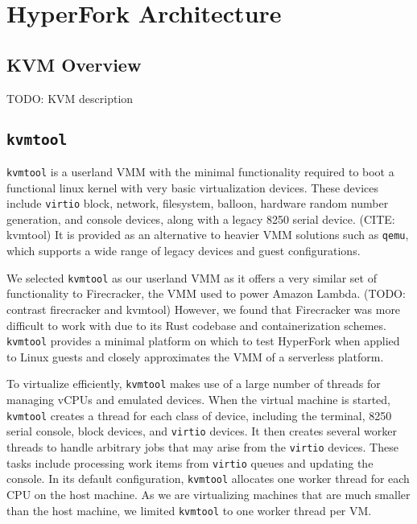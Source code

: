 
\newcommand{\kvmtool}[0]{\texttt{kvmtool}}
\newcommand{\virtio}[0]{\texttt{virtio}}

\section{HyperFork Architecture} \label{sec:design}

\subsection{KVM Overview}

TODO: KVM description

\subsection{\kvmtool}

\kvmtool{} is a userland VMM with the minimal functionality required to boot a
functional linux kernel with very basic virtualization devices. These devices
include \virtio{} block, network, filesystem, balloon, hardware random number
generation, and console devices, along with a legacy 8250 serial device. (CITE:
kvmtool) It is provided as an alternative to heavier VMM solutions such as
\texttt{qemu}, which supports a wide range of legacy devices and guest
configurations.

We selected \kvmtool{} as our userland VMM as it offers a very similar set of
functionality to Firecracker, the VMM used to power Amazon Lambda. (TODO:
contrast firecracker and kvmtool) However, we found that Firecracker was more
difficult to work with due to its Rust codebase and containerization schemes.
\kvmtool{} provides a minimal platform on which to test HyperFork when applied
to Linux guests and closely approximates the VMM of a serverless platform.

To virtualize efficiently, \kvmtool{} makes use of a large number of threads for
managing vCPUs and emulated devices. When the virtual machine is started,
\kvmtool{} creates a thread for each class of device, including the terminal,
8250 serial console, block devices, and \virtio{} devices. It then creates
several worker threads to handle arbitrary jobs that may arise from the
\virtio{} devices. These tasks include processing work items from \virtio{}
queues and updating the console. In its default configuration, \kvmtool{}
allocates one worker thread for each CPU on the host machine. As we are
virtualizing machines that are much smaller than the host machine, we limited
\kvmtool{} to one worker thread per VM.

